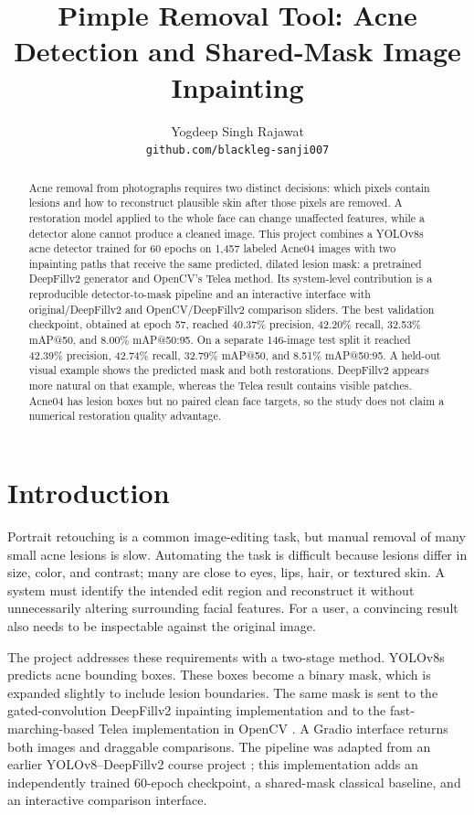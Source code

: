 \documentclass[10pt,twocolumn,letterpaper]{article}
\title{Pimple Removal Tool: Acne Detection and Shared-Mask Image Inpainting}
\author{Yogdeep Singh Rajawat\\
\texttt{github.com/blackleg-sanji007}}
\begin{document}
\maketitle

\begin{abstract}
Acne removal from photographs requires two distinct decisions: which pixels
contain lesions and how to reconstruct plausible skin after those pixels are
removed. A restoration model applied to the whole face can change unaffected
features, while a detector alone cannot produce a cleaned image. This project
combines a YOLOv8s acne detector trained for 60 epochs on 1,457 labeled
Acne04 images with two inpainting paths that receive the same predicted,
dilated lesion mask: a pretrained DeepFillv2 generator and OpenCV's Telea
method. Its system-level contribution is a reproducible detector-to-mask
pipeline and an interactive interface with original/DeepFillv2 and
OpenCV/DeepFillv2 comparison sliders. The best validation checkpoint,
obtained at epoch 57, reached 40.37\% precision, 42.20\% recall, 32.53\%
mAP@50, and 8.00\% mAP@50:95. On a separate 146-image test split it reached
42.39\% precision, 42.74\% recall, 32.79\% mAP@50, and 8.51\%
mAP@50:95. A held-out visual example shows the predicted mask and both
restorations. DeepFillv2 appears more natural on that example, whereas the
Telea result contains visible patches. Acne04 has lesion boxes but no paired
clean face targets, so the study does not claim a numerical restoration
quality advantage.
\end{abstract}

\section{Introduction}
\label{sec:intro}

Portrait retouching is a common image-editing task, but manual removal of
many small acne lesions is slow. Automating the task is difficult because
lesions differ in size, color, and contrast; many are close to eyes, lips,
hair, or textured skin. A system must identify the intended edit region and
reconstruct it without unnecessarily altering surrounding facial features.
For a user, a convincing result also needs to be inspectable against the
original image.

The project addresses these requirements with a two-stage method.
YOLOv8s \cite{ultralytics} predicts acne bounding boxes. These boxes become
a binary mask, which is expanded slightly to include lesion boundaries.
The same mask is sent to the gated-convolution DeepFillv2 inpainting
implementation \cite{yu2019,deepfillrepo} and to the fast-marching-based
Telea implementation in OpenCV \cite{telea2004,opencvdocs}. A Gradio
interface returns both images and draggable comparisons. The pipeline was
adapted from an earlier YOLOv8--DeepFillv2 course project
\cite{architrepo}; this implementation adds an independently trained
60-epoch checkpoint, a shared-mask classical baseline, and an interactive
comparison interface.
\end{document}
